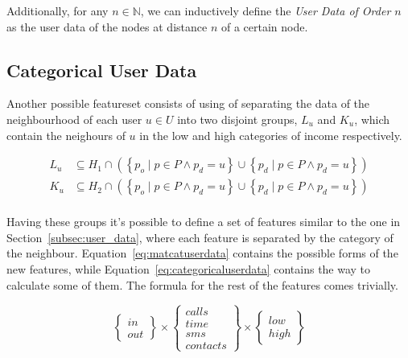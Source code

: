 Additionally, for any $n \in \mathbb{N}$, we can inductively define the \emph{User Data of Order $n$} as the user data of the nodes at distance $n$ of a certain node.

\subsection{Categorical User Data}
\label{subsec:categoricaluserdata}

Another possible featureset consists of using of separating the data of the neighbourhood of each user $u \in U$ into two disjoint groups, $L_u$ and $K_u$, which contain the neighours of $u$ in the low and high categories of income respectively\footnotemark{}.


\begin{equation}
\begin{split}
	L_u &\subseteq H_1 \cap \left( \left\{ p_o \mid p \in P \land p_d = u \right\} \cup \left\{ p_d \mid p \in P \land p_d = u \right\} \right) \\
	K_u &\subseteq H_2 \cap \left( \left\{ p_o \mid p \in P \land p_d = u \right\} \cup \left\{ p_d \mid p \in P \land p_d = u \right\} \right) \\
\end{split}
\end{equation}

Having these groups it's possible to define a set of features similar to the one in Section~\ref{subsec:user_data}, where each feature is separated by the category of the neighbour. Equation~\ref{eq:matcatuserdata} contains the possible forms of the new features, while Equation~\ref{eq:categoricaluserdata} contains the way to calculate some of them. The formula for the rest of the features comes trivially.

\begin{equation}
\label{eq:matcatuserdata}
	\begin{Bmatrix} in \\ out \end{Bmatrix}
	\times
	\begin{Bmatrix} calls \\ time \\ sms \\ contacts \end{Bmatrix}
	\times
	\begin{Bmatrix} low \\ high \end{Bmatrix}
\end{equation}


